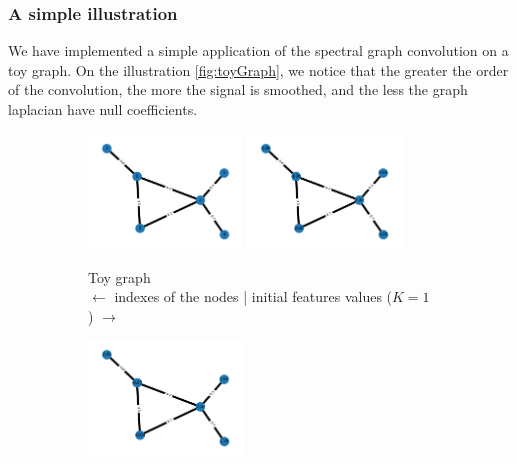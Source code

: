\subsubsection{A simple illustration}

We have implemented a simple application of the spectral graph convolution on a toy graph. 
On the illustration \ref{fig:toyGraph}, we notice that the greater the order of the convolution,  the more the signal is smoothed, and the less the graph laplacian have null coefficients.

 \begin{figure}
    \centering
    \begin{subfigure}{0.45\textwidth}
        \centering
        \includegraphics[width=0.45\textwidth]{figures/toy_graph_init.png}
        \includegraphics[width=0.45\textwidth]{figures/toy_graph_conv_K1.png}
        \caption{Toy graph\\ $\leftarrow$ indexes of the nodes | initial features values ($K=1$) $\rightarrow$}
    \end{subfigure}
    \hfill
    \begin{subfigure}{0.45\textwidth}
        \centering
        \includegraphics[width=0.45\textwidth]{figures/toy_graph_conv_K2.png}

\end{subfigure}
\end{figure}
